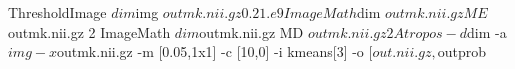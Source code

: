 ThresholdImage $dim $img ${out}mk.nii.gz 0.2 1.e9 
ImageMath $dim ${out}mk.nii.gz ME ${out}mk.nii.gz 2 
ImageMath $dim ${out}mk.nii.gz MD ${out}mk.nii.gz 2 
Atropos -d $dim -a $img -x ${out}mk.nii.gz -m [0.05,1x1]   -c [10,0]  -i kmeans[3] -o [${out}.nii.gz,${out}prob%
